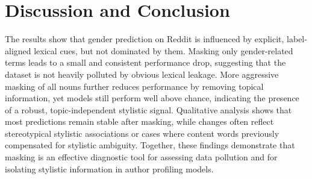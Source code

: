 \documentclass[11pt]{article}
\begin{document}

\section{Discussion and Conclusion}
The results show that gender prediction on Reddit is influenced by explicit, label-aligned lexical cues, but not dominated by them. Masking only gender-related terms leads to a small and consistent performance drop, suggesting that the dataset is not heavily polluted by obvious lexical leakage. More aggressive masking of all nouns further reduces performance by removing topical information, yet models still perform well above chance, indicating the presence of a robust, topic-independent stylistic signal. Qualitative analysis shows that most predictions remain stable after masking, while changes often reflect stereotypical stylistic associations or cases where content words previously compensated for stylistic ambiguity. Together, these findings demonstrate that masking is an effective diagnostic tool for assessing data pollution and for isolating stylistic information in author profiling models.


\end{document}
